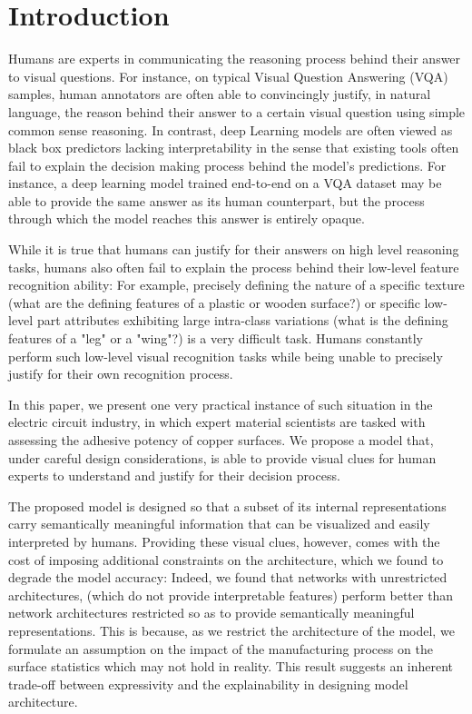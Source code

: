 \documentclass[10pt,twocolumn,letterpaper]{article}
\begin{document}
	\section{Introduction}
	
	Humans are experts in communicating the reasoning process behind their answer to visual questions.
	For instance, on typical Visual Question Answering (VQA) samples, 
	human annotators are often able to convincingly justify, in natural language, the reason 
	behind their answer to a certain visual question using simple common sense reasoning.
	In contrast, deep Learning models are often viewed as black box predictors lacking interpretability 
	in the sense that existing tools often fail to explain the decision making process behind the model’s predictions.
	For instance, a deep learning model trained end-to-end on a VQA dataset may be able to provide the same answer as its
	human counterpart, but the process through which the model reaches this answer is entirely opaque.
	
	While it is true that humans can justify for their answers on high level reasoning tasks, 
	humans also often fail to explain the process behind their low-level feature recognition ability:
	For example, precisely defining the nature of a specific texture 
	(what are the defining features of a plastic or wooden surface?) 
	or specific low-level part attributes exhibiting large intra-class variations 
	(what is the defining features of a "leg" or a "wing"?) is a very difficult task.
    Humans constantly perform such low-level visual recognition tasks 
	while being unable to precisely justify for their own recognition process.
	
In this paper, we present one very practical instance of such situation in the electric circuit industry, 
in which expert material scientists are tasked with assessing the adhesive potency of copper surfaces.
We propose a model that, under careful design considerations, is able to provide visual clues 
for human experts to understand and justify for their decision process.
	
The proposed model is designed so that a subset of its internal representations carry semantically meaningful 
information that can be visualized and easily interpreted by humans.
Providing these visual clues, however, comes with the cost of imposing additional constraints on the architecture,
which we found to degrade the model accuracy:
Indeed, we found that networks with unrestricted architectures, 
(which do not provide interpretable features)
perform better than network architectures restricted so as to provide 
semantically meaningful representations.
This is because, as we restrict the architecture of the model, 
we formulate an assumption on the impact of the manufacturing process 
on the surface statistics which may not hold in reality.
This result suggests an inherent trade-off between  
expressivity and the explainability in designing model architecture.
	
\end{document}
